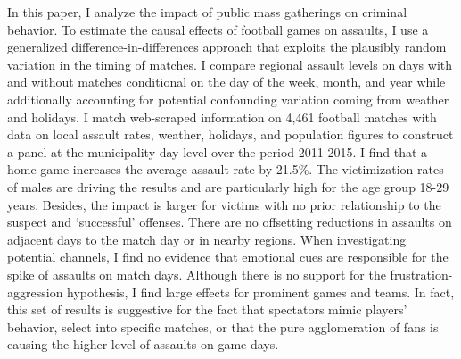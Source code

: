 \documentclass[11pt, a4paper]{article} %
\begin{document}
In this paper, I analyze the impact of public mass gatherings on criminal behavior. To estimate the causal effects of football games on assaults, I use a generalized difference-in-differences approach that exploits the plausibly random variation in the timing of matches. I compare regional assault levels on days with and without matches conditional on the day of the week, month, and year while additionally accounting for potential confounding variation coming from weather and holidays. I match web-scraped information on 4,461 football matches with data on local assault rates, weather, holidays, and population figures to construct a panel at the municipality-day level over the period 2011-2015. I find that a home game increases the average assault rate by 21.5\%. The victimization rates of males are driving the results and are particularly high for the age group 18-29 years. Besides, the impact is 
larger for victims with no prior relationship to the suspect and `successful' offenses. There are no offsetting reductions in assaults on adjacent days to the match day or in nearby regions. When investigating potential channels, I find no evidence that emotional cues are responsible for the spike of assaults on match days. Although there is no support for the frustration-aggression hypothesis, I find large effects for prominent games and teams. In fact, this set of results is suggestive for the fact that spectators mimic players' behavior, select into specific matches, or that the pure agglomeration of fans is causing the higher level of assaults on game days. 
\end{document}
